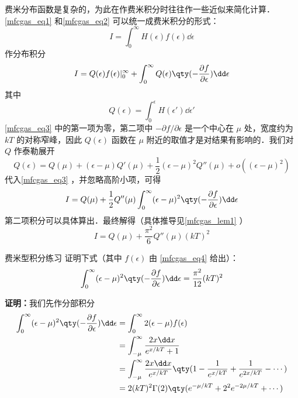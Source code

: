 费米分布函数是复杂的，为此在作费米积分时往往作一些近似来简化计算．\autoref{mfcgas_eq1} 和\autoref{mfcgas_eq2} 可以统一成费米积分的形式：
\begin{equation}
I=\int_0^\infty H(\epsilon)f(\epsilon)\dd\epsilon
\end{equation}
作分布积分
\begin{equation}\label{mfcgas_eq3}
I=Q(\epsilon)f(\epsilon)|_0^\infty + \int_0^\infty Q(\epsilon)\qty(-\frac{\partial f}{\partial\epsilon})\dd \epsilon
\end{equation}
其中
\begin{equation}
Q(\epsilon)=\int_0^\epsilon H(\epsilon')\dd\epsilon'
\end{equation}
\autoref{mfcgas_eq3} 中的第一项为零，第二项中 $-\partial f/\partial \epsilon$ 是一个中心在 $\mu$ 处，宽度约为 $kT$ 的对称窄峰，因此 $Q(\epsilon)$ 函数在 $\mu$ 附近的取值才是对结果有影响的．我们对 $Q$ 作泰勒展开
\begin{equation}
Q(\epsilon)=Q(\mu)+(\epsilon-\mu)Q'(\mu)+\frac{1}{2}(\epsilon-\mu)^2 Q''(\mu)+o((\epsilon-\mu)^2)
\end{equation}
代入\autoref{mfcgas_eq3} ，并忽略高阶小项，可得
\begin{equation}
I=Q(\mu)+\frac{1}{2}Q''(\mu)\int_0^\infty (\epsilon-\mu)^2 \qty(-\frac{\partial f}{\partial \epsilon})\dd\epsilon
\end{equation}
第二项积分可以具体算出．最终解得（具体推导见\autoref{mfcgas_lem1} ）
\begin{equation}
I=Q(\mu)+\frac{\pi^2}{6}Q''(\mu)(k T)^2
\end{equation}
\begin{lemma}{费米型积分练习}\label{mfcgas_lem1}
证明下式（其中 $f(\epsilon)$ 由 \autoref{mfcgas_eq4} 给出）：
\begin{equation}
\int_0^\infty (\epsilon-\mu)^2 \qty(-\frac{\partial f}{\partial \epsilon})\dd\epsilon
=\frac{\pi^2}{12}(kT)^2
\end{equation}

\textbf{证明：}我们先作分部积分
\begin{equation}
\begin{aligned}
\int_0^\infty (\epsilon-\mu)^2 \qty(-\frac{\partial f}{\partial \epsilon})\dd\epsilon
&=\int_0^\infty 2(\epsilon-\mu) f(\epsilon)\\
&=\int_{-\mu}^\infty \frac{2x\dd x}{e^{x/kT}+1}\\
&=\int_{-\mu}^\infty \frac{2x\dd x}{e^{x/kT}}\qty( 1- \frac{1}{e^{x/kT}}+\frac{1}{e^{2x/kT}}-\cdots )\\
&=2 (kT)^2 \Gamma(2)\qty(e^{-\mu/kT}+2^2e^{-2\mu/kT}+\cdots)
\end{aligned}
\end{equation}
\end{lemma}